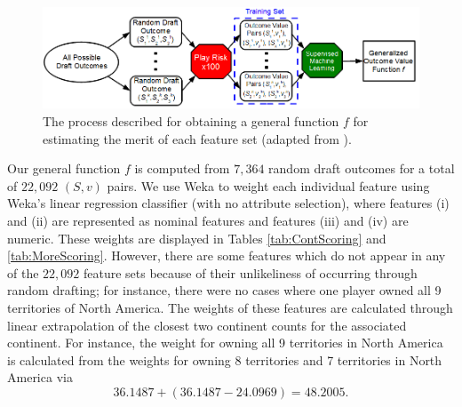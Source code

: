 \documentclass[letterpaper]{article}
\numberwithin{equation}{section}
\numberwithin{theorem}{section}
\numberwithin{lemma}{section}
\numberwithin{df}{section}
\begin{document}
\begin{figure}[t]
	\centering
	\includegraphics[scale=0.5]{figs/MachineLearner.png}
	\caption{The process described for obtaining a general function $f$ for estimating the merit of each feature set (adapted from \cite[Figure 5.1]{GregLeeThesis}).}
	\label{fig:MachLearn}
\end{figure}

Our general function $f$ is computed from $7,364$ random draft outcomes for a total of $22,092$ $(S,v)$ pairs.  We use Weka \cite{Weka} to weight each individual feature using Weka's linear regression classifier (with no attribute selection), where features (i) and (ii) are represented as nominal features and features (iii) and (iv) are  numeric.  These weights are displayed in Tables \ref{tab:ContScoring} and \ref{tab:MoreScoring}.  However, there are some features which do not appear in any of the $22,092$ feature sets because of their unlikeliness of occurring through random drafting; for instance, there were no cases where one player owned all 9 territories of North America.  The weights of these features are calculated through linear extrapolation of the closest two continent counts for the associated continent.  For instance, the weight for owning all 9 territories in North America is calculated from the weights for owning 8 territories and 7 territories in North America via
\[ 36.1487 + (36.1487 - 24.0969) = 48.2005. \]  
\end{document}
